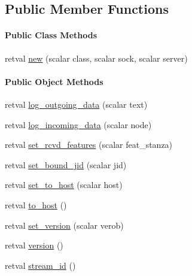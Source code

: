 \subsection*{\-Public \-Member \-Functions}
\begin{Indent}\paragraph*{\-Public \-Class \-Methods}
\begin{DoxyCompactItemize}
\item 
retval \hyperlink{class_d_jabberd_1_1_connection_a5be9a75bf16adc9c8313713dda4e72bf}{new} (scalar class, scalar sock, scalar server)
\end{DoxyCompactItemize}
\end{Indent}
\begin{Indent}\paragraph*{\-Public \-Object \-Methods}
\begin{DoxyCompactItemize}
\item 
retval \hyperlink{class_d_jabberd_1_1_connection_a92833ff4c3bf394f167dacdfe5348b09}{log\-\_\-outgoing\-\_\-data} (scalar text)
\item 
retval \hyperlink{class_d_jabberd_1_1_connection_aca6449f4be97bb1b3c3ec4c137a8f1c4}{log\-\_\-incoming\-\_\-data} (scalar node)
\item 
retval \hyperlink{class_d_jabberd_1_1_connection_a9e1c246b2a680005868cc7b69ef0abe5}{set\-\_\-rcvd\-\_\-features} (scalar feat\-\_\-stanza)
\item 
retval \hyperlink{class_d_jabberd_1_1_connection_a9a0450f4a2556fc040fbc8c5e6d46931}{set\-\_\-bound\-\_\-jid} (scalar jid)
\item 
retval \hyperlink{class_d_jabberd_1_1_connection_a2761bd89d4e3fa7198bcbcf5037c45ce}{set\-\_\-to\-\_\-host} (scalar host)
\item 
retval \hyperlink{class_d_jabberd_1_1_connection_a515e0bf1c50c78032fc61fb9c05239a7}{to\-\_\-host} ()
\item 
retval \hyperlink{class_d_jabberd_1_1_connection_a76ada7980b6968dbc4b2ff26e41db639}{set\-\_\-version} (scalar verob)
\item 
retval \hyperlink{class_d_jabberd_1_1_connection_a20f80b8db409f5e9611a004888a07487}{version} ()
\item 
retval \hyperlink{class_d_jabberd_1_1_connection_aebeddca43d2d7fa92549488fa2f99a87}{stream\-\_\-id} ()

\end{DoxyCompactItemize}
\end{Indent}
